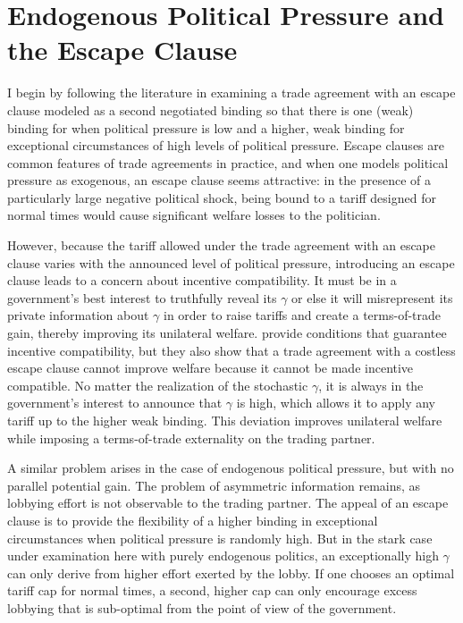 \documentclass[12pt,titlepage]{article}
\newcommand{\ga}{\gamma}
\begin{document}
\section{Endogenous Political Pressure and the Escape Clause}
\label{sec:escape}
I begin by following the literature in examining a trade agreement with an escape clause modeled as a second negotiated binding so that there is one (weak) binding for when political pressure is low and a higher, weak binding for exceptional circumstances of high levels of political pressure. Escape clauses are common features of trade agreements in practice, and when one models political pressure as exogenous, an escape clause seems attractive: in the presence of a particularly large negative political shock, being bound to a tariff designed for normal times would cause significant welfare losses to the politician.

However, because the tariff allowed under the trade agreement with an escape clause varies with the announced level of political pressure, introducing an escape clause leads to a concern about incentive compatibility. It must be in a government's best interest to truthfully reveal its $\ga$ or else it will misrepresent its private information about $\ga$ in order to raise tariffs and create a terms-of-trade gain, thereby improving its unilateral welfare. \Textcite{bs2005} provide conditions that guarantee incentive compatibility, but they also show that a trade agreement with a costless escape clause cannot improve welfare because it cannot be made incentive compatible. No matter the realization of the stochastic $\ga$, it is always in the government's interest to announce that $\ga$ is high, which allows it to apply any tariff up to the higher weak binding. This deviation improves unilateral welfare while imposing a terms-of-trade externality on the trading partner.

A similar problem arises in the case of endogenous political pressure, but with no parallel potential gain. The problem of asymmetric information remains, as lobbying effort is not observable to the trading partner. The appeal of an escape clause is to provide the flexibility of a higher binding in exceptional circumstances when political pressure is randomly high. But in the stark case under examination here with purely endogenous politics, an exceptionally high $\ga$ can only derive from higher effort exerted by the lobby. If one chooses an optimal tariff cap for normal times, a second, higher cap can only encourage excess lobbying that is sub-optimal from the point of view of the government.
\end{document}
